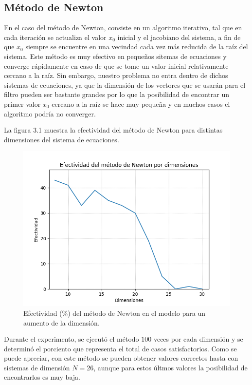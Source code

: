\subsection{M\'etodo de Newton}

\par En el caso del m\'etodo de Newton, consiste en un algoritmo iterativo, tal que en cada iteraci\'on se actualiza el valor $x_0$ inicial y el jacobiano del sistema, a fin de que $x_0$ siempre se encuentre en una vecindad cada vez m\'as reducida de la ra\'iz del sistema. Este m\'etodo es muy efectivo en peque\~nos sitemas de ecuaciones y converge r\'apidamente en caso de que se tome un valor inicial relativamente cercano a la ra\'iz. Sin embargo, nuestro problema no entra dentro de dichos sistemas de ecuaciones, ya que la dimensi\'on de los vectores que se usar\'an para el filtro pueden ser bastante grandes por lo que la posibilidad de encontrar un primer valor $x_0$ cercano a la ra\'iz se hace muy peque\~na y en muchos casos el algoritmo podr\'ia no converger.\\

\par La figura 3.1 muestra la efectividad del m\'etodo de Newton para distintas dimensiones del sistema de ecuaciones.

\begin{figure}[h]
\center
\includegraphics[scale=.45]{Graphics/Newton.png}
\caption{Efectividad (\%) del m\'etodo de Newton en el modelo para un aumento de la dimensi\'on.}
\end{figure}

\par Durante el experimento, se ejecut\'o el m\'etodo $100$ veces por cada dimensi\'on y se determin\'o el porciento que representa el total de casos satisfactorios. Como se puede apreciar, con este m\'etodo se pueden obtener valores correctos hasta con sistemas de dimensi\'on $N=26$, aunque para estos \'ultmos valores la posibilidad de encontrarlos es muy baja.

